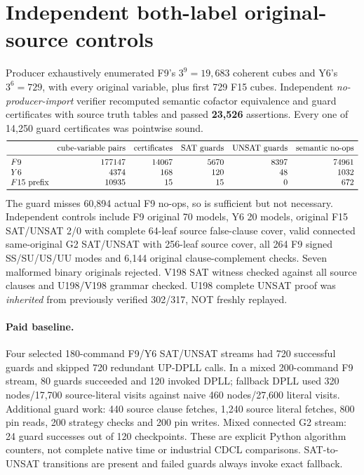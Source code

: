 \documentclass[11pt]{article}
\begin{document}
\section{Independent both-label original-source controls}
Producer exhaustively enumerated F9's $3^9=19,683$ coherent cubes and Y6's $3^6=729$, with every original variable, plus first 729 F15 cubes. Independent \emph{no-producer-import} verifier recomputed semantic cofactor equivalence and guard certificates with source truth tables and passed \textbf{23,526} assertions. Every one of 14,250 guard certificates was pointwise sound.
\[
\begin{array}{lrrrrr}\toprule
 &\text{cube-variable pairs}&\text{certificates}&\text{SAT guards}&\text{UNSAT guards}&\text{semantic no-ops}\\\midrule
F9&177147&14067&5670&8397&74961\\
Y6&4374&168&120&48&1032\\
F15\text{ prefix}&10935&15&15&0&672\\\bottomrule
\end{array}
\]
The guard misses 60,894 actual F9 no-ops, so is sufficient but not necessary. Independent controls include F9 original 70 models, Y6 20 models, original F15 SAT/UNSAT 2/0 with complete 64-leaf source false-clause cover, valid connected same-original G2 SAT/UNSAT with 256-leaf source cover, all 264 F9 signed SS/SU/US/UU modes and 6,144 original clause-complement checks. Seven malformed binary originals rejected. V198 SAT witness checked against all source clauses and U198/V198 grammar checked. U198 complete UNSAT proof was \emph{inherited} from previously verified 302/317, NOT freshly replayed.
\paragraph{Paid baseline.} Four selected 180-command F9/Y6 SAT/UNSAT streams had 720 successful guards and skipped 720 redundant UP-DPLL calls. In a mixed 200-command F9 stream, 80 guards succeeded and 120 invoked DPLL; fallback DPLL used 320 nodes/17,700 source-literal visits against naive 460 nodes/27,600 literal visits. Additional guard work: 440 source clause fetches, 1,240 source literal fetches, 800 pin reads, 200 strategy checks and 200 pin writes. Mixed connected G2 stream: 24 guard successes out of 120 checkpoints. These are explicit Python algorithm counters, not complete native time or industrial CDCL comparisons. SAT-to-UNSAT transitions are present and failed guards always invoke exact fallback.
\end{document}
